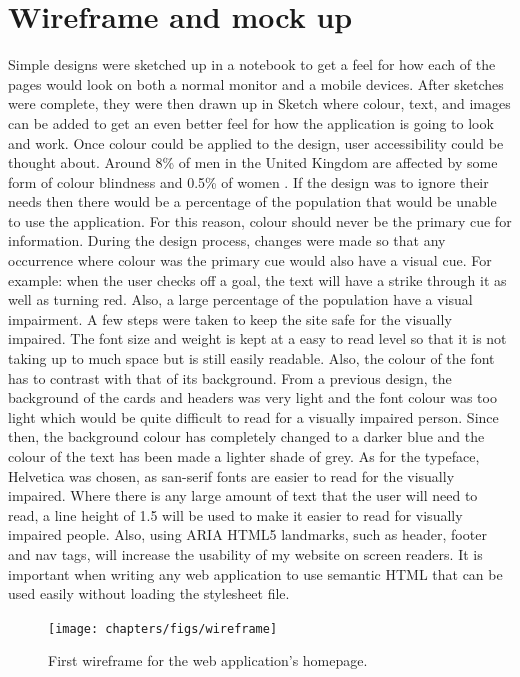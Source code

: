 \section{Wireframe and mock up}
Simple designs were sketched up in a notebook to get a feel for how each of the pages would look on both a normal monitor and a mobile devices. After sketches were complete, they were then drawn up in Sketch \citep{sketch:2013} where colour, text, and images can be added to get an even better feel for how the application is going to look and work. Once colour could be applied to the design, user accessibility could be thought about. Around 8\% of men in the United Kingdom are affected by some form of colour blindness and 0.5\% of women \citep{colourBlind}. If the design was to ignore their needs then there would be a percentage of the population that would be unable to use the application. For this reason, colour should never be the primary cue for information. During the design process, changes were made so that any occurrence where colour was the primary cue would also have a visual cue. For example: when the user checks off a goal, the text will have a strike through it as well as turning red. Also, a large percentage of the population have a visual impairment. A few steps were taken to keep the site safe for the visually impaired. The font size and weight is kept at a easy to read level so that it is not taking up to much space but is still easily readable. Also, the colour of the font has to contrast with that of its background. From a previous design, the background of the cards and headers was very light and the font colour was too light which would be quite difficult to read for a visually impaired person. Since then, the background colour has completely changed to a darker blue and the colour of the text has been made a lighter shade of grey. As for the typeface, Helvetica was chosen, as san-serif fonts are easier to read for the visually impaired. Where there is any large amount of text that the user will need to read, a line height of 1.5 will be used to make it easier to read for visually impaired people. Also, using ARIA HTML5 landmarks, such as header, footer and nav tags, will increase the usability of my website on screen readers. It is important when writing any web application to use semantic HTML that can be used easily without loading the stylesheet file.\\

\begin{figure}[!ht]
\centering
\texttt{[image: chapters/figs/wireframe]}
\caption{First wireframe for the web application's homepage.}
\label{fig:erd}
\end{figure}

